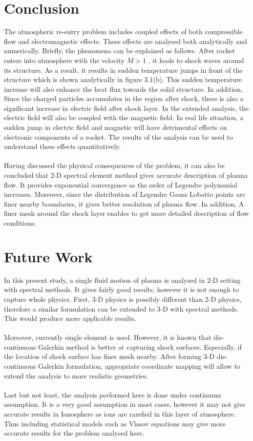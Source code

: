 \documentclass[12pt]{report}
\begin{document}
\chapter{Conclusion}
The atmospheric re-entry problem includes coupled effects of both compressible flow and electromagnetic effects. These effects are analysed both analytically and numerically. Briefly, the phenomena can be explained as follows. After rocket enters into atmosphere with the velocity $M>1$ , it leads to shock waves around its structure. As a result, it results in sudden temperature jumps in front of the structure which is shown analytically in figure 3.1(b). This sudden temperature increase will also enhance the heat flux towards the solid structure. In addition,  Since the charged particles accumulates in the region after shock, there is also a significant increase in electric field after shock layer. In the extended analysis, the electric field will also be coupled with the magnetic field. In real life situation, a sudden jump in electric field and magnetic will have detrimental effects on electronic components of a rocket. The results of the analysis can be used to understand these effects quantitatively. 
\\
\\
Having discussed the physical consequences of the problem, it can also be concluded that 2-D spectral element method gives accurate description of plasma flow. It provides exponential convergence as the order of Legendre polynomial increases. Moreover, since the distribution of Legendre Gauss Lobatto points are finer nearby boundaries, it gives better resolution of plasma flow. In addition, A finer mesh around the shock layer enables to get more detailed description of flow conditions.
 
\chapter{Future Work}
In this present study, a single fluid motion of plasma is analysed in 2-D setting with spectral methods. It gives fairly good results, however it is not enough to capture whole physics. First, 3-D physics is possibly different than 2-D physics, therefore a similar formulation can be extended to 3-D with spectral methods. This would produce more applicable results.
\\
\\
Moreover, currently single element is used. However, it is known that dis-continuous Galerkin\cite{Hesthaven} method is better at capturing shock surfaces. Especially, if the location of shock surface has finer mesh nearby. After forming 3-D dis-continuous Galerkin formulation, appropriate coordinate mapping will allow to extend the analysis to more realistic geometries. 
 \\
 \\
 Last but not least, the analysis performed here is done under continuum assumption. It is a very good assumption in most cases, however it may not give accurate results in Ionosphere as ions are rarefied in this layer of atmosphere. Thus including statistical models such as Vlasov equations\cite{IntPlasma} may give more accurate results for the problem analysed here.
\end{document}
